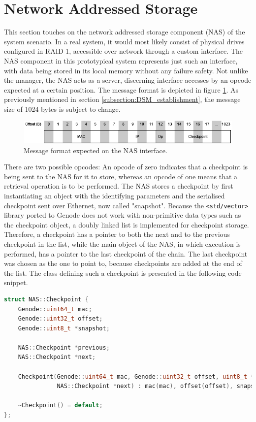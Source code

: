 \section{Network Addressed Storage}
This section touches on the network addressed storage component (NAS) of the system scenario. In a real system, it would most likely consist of physical drives configured in RAID 1, accessible over network through a custom interface. The NAS component in this prototypical system represents just such an interface, with data being stored in its local memory without any failure safety. Not unlike the manager, the NAS acts as a server, discerning interface accesses by an opcode expected at a certain position. The message format is depicted in figure \ref{fig:NAS_message_format}. As previously mentioned in section \ref{subsection:DSM_establishment}, the message size of 1024 bytes is subject to change.
\begin{figure}
    \centering
    \includegraphics[width=\textwidth]{Images/NAS_message_format.png}
    \caption{Message format expected on the NAS interface.}
    \label{fig:NAS_message_format}
\end{figure}
There are two possible opcodes: An opcode of zero indicates that a checkpoint is being sent to the NAS for it to store, whereas an opcode of one means that a retrieval operation is to be performed. The NAS stores a checkpoint by first instantiating an object with the identifying parameters and the serialised checkpoint sent over Ethernet, now called "snapshot". Because the \verb|<std/vector>| library ported to Genode does not work with non-primitive data types such as the checkpoint object, a doubly linked list is implemented for checkpoint storage. Therefore, a checkpoint has a pointer to both the next and to the previous checkpoint in the list, while the main object of the NAS, in which execution is performed, has a pointer to the last checkpoint of the chain. The last checkpoint was chosen as the one to point to, because checkpoints are added at the end of the list. The class defining such a checkpoint is presented in the following code snippet. 
\newpage
\begin{lstlisting}[language=C++, caption={Checkpoint class used by the NAS.}] 
struct NAS::Checkpoint {
    Genode::uint64_t mac;
    Genode::uint32_t offset;
    Genode::uint8_t *snapshot;

    NAS::Checkpoint *previous;
    NAS::Checkpoint *next;

    Checkpoint(Genode::uint64_t mac, Genode::uint32_t offset, uint8_t *snapshot, NAS::Checkpoint *previous,
               NAS::Checkpoint *next) : mac(mac), offset(offset), snapshot(snapshot), previous(previous), next(next) {}

    ~Checkpoint() = default;
};
\end{lstlisting}
